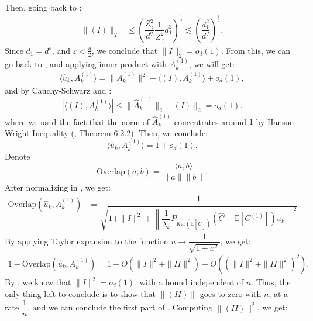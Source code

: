 \documentclass[]{article}
\numberwithin{equation}{section}
\theoremstyle{definition}
\newcommand{\EE}{\mathbb{E}}
\begin{document}
Then, going back to : 
\begin{align}
    \| (I) \|_2 & \leq \left (\dfrac{Z_\gamma^2}{d^{q}} \dfrac{1}{Z_\gamma^{2}}d_1^{2}  \right )^{\frac{1}{2}} \lesssim \left (\dfrac{d_1^{2} }{d^{q}} \right )^{\frac{1}{2}}.
    \label{eq:I_is_small}
\end{align}
Since $d_1 = d^{\varepsilon}$, and $\varepsilon <\frac{q}{2}$, we conclude that $\| I\|_{2} = o_{d}(1)$. From this, we can go back to , and applying inner product with $A^{(1)}_{k}$, we will get: 
\begin{align}
 \langle \hat{u}_{k}, A^{(1)}_{k}\rangle  = \| A^{(1)}_{k }\|^{2} + \langle (I), A^{(1)}_k \rangle +  o_{d}(1),    
\end{align}
and by Cauchy-Schwarz and : 
\begin{equation}
    \left | \langle (I), A^{(1)}_k \rangle \right | \leq \| \hat{A}^{(1)}_{k}\|_{2} \| (I)\|_{2} = o_{d}(1). 
\end{equation}
where we used the fact that the norm of $\hat{A}^{(1)}_{k}$ concentrates around $1$ by Hanson-Wright Inequality (\cite{vershynin2018high}, Theorem 6.2.2). Then, we conclude: 
\begin{equation}
    \langle \hat{u}_{k}, A^{(1)}_{k}\rangle = 1 + o_{d}(1).
    \label{eq:inner_product_I}
\end{equation}
Denote
\begin{equation}
    \mathrm{Overlap}(a,b) = \dfrac{\langle a, b \rangle }{\| a\| \|b\|}. 
\end{equation}
After normalizing in , we get: 
\begin{align}
   \mathrm{Overlap}(\hat{u}_{k}, A^{(1)}_{k}) & = \dfrac{1}{\sqrt{1 + \| I\|^{2} + \left \| \dfrac{1}{\lambda_{k}} P_{\mathrm{Ker}(\EE[\hat{C}])} (\hat{C} - \mathbb{E}[C^{(1)}] ) u_{k} \right \|^{2} }}
   \label{eq:overlap_after_perturbation}
\end{align}
 By applying Taylor expansion to the function $u \to \dfrac{1}{\sqrt{1 + x^{2}}}$, we get: 
\begin{align}
    1 - \mathrm{Overlap}(\hat{u}_{k}, A^{(1)}_{k}) = 1 - O \left ( \| I\|^{2} + \| II\|^{2}\right ) + O((\| I\|^{2} + \|II\|^{2})^{2}).
\end{align}
By , we know that $\| I\|^{2} =o_{d}(1)$, with a bound independent of $n$. Thus, the only thing left to conclude is to show that $\| (II)\|$ goes to zero with $n$, at a rate $\dfrac{1}{n}$, and we can conclude the first part of . Computing $\|(II)\|^{2}$, we get: 
\end{document}
